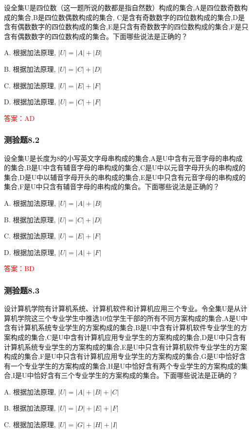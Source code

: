 \documentclass[UTF8, heading=true]{ctexart}
\begin{document}
设全集U是四位数（这一题所说的数都是指自然数）构成的集合,A是四位数奇数构成的集合,B是四位数偶数构成的集合,
C是含有奇数数字的四位数构成的集合,D是含有偶数数字的四位数构成的集合,E是只含有奇数数字的四位数构成的集合,F是只含有偶数数字的四位数构成的集合。下面哪些说法是正确的？

A. 根据加法原理, $|U|=|A|+|B|$

B. 根据加法原理, $|U|=|C|+|D|$

C. 根据加法原理, $|U|=|E|+|F|$

D. 根据加法原理, $|U|=|C|+|F|$

\textcolor{red}{答案：AD}

\subsubsection{测验题8.2}

设全集U是长度为8的小写英文字母串构成的集合,A是U中含有元音字母的串构成的集合,B是U中含有辅音字母的串构成的集合,C是U中以元音字母开头的串构成的集合,D是U中以辅音字母开头的串构成的集合,E是U中只含有元音字母的串构成的集合,F是U中只含有辅音字母的串构成的集合。下面哪些说法是正确的？

A. 根据加法原理, $|U|=|A|+|B|$

B. 根据加法原理, $|U|=|C|+|D|$

C. 根据加法原理, $|U|=|E|+|F|$

D. 根据加法原理, $|U|=|A|+|F|$

\textcolor{red}{答案：BD}

\subsubsection{测验题8.3}

设计算机学院有计算机系统、计算机软件和计算机应用三个专业。令全集U是从计算机学院这三个专业学生中推选10位学生干部的所有不同方案构成的集合,A是U中含有计算机系统专业学生的方案构成的集合,B是U中含有计算机软件专业学生的方案构成的集合,C是U中含有计算机应用专业学生的方案构成的集合,D是U中只含有计算机系统专业学生的方案构成的集合,E是U中只含有计算机软件专业学生的方案构成的集合,F是U中只含有计算机应用专业学生的方案构成的集合,G是U中恰好含有一个专业学生的方案构成的集合,H是U中恰好含有两个专业学生的方案构成的集合,I是U中恰好含有三个专业学生的方案构成的集合。下面哪些说法是正确的？

A. 根据加法原理, $|U|=|A|+|B|+|C|$

B. 根据加法原理, $|U|=|D|+|E|+|F|$

C. 根据加法原理, $|U|=|G|+|H|+|I|$
\end{document}
